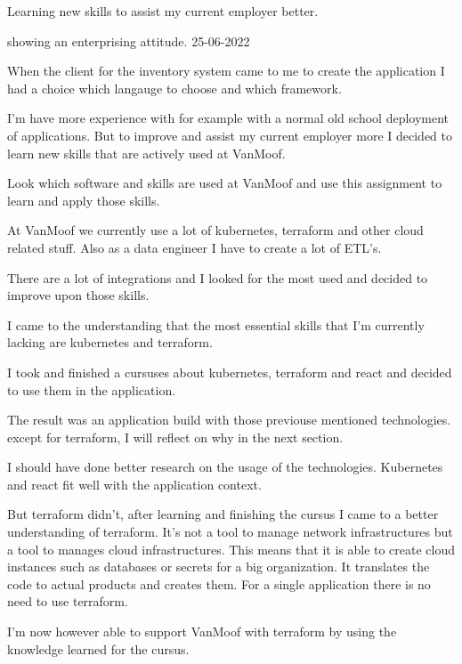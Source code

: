 {%
	\bewijs
	{%
		Learning new skills to assist my current employer better.
	}
	{%
		\starr
		{%
			showing an enterprising attitude.%
		}
		{%
			25-06-2022
		}
		{%

			When the client for the inventory system came to me to create the application I had a choice which langauge to choose and which framework.

			I'm have more experience with for example with a normal old school deployment of applications.
			But to improve and assist my current employer more I decided to learn new skills that are actively used at VanMoof.
		}
		{%
			Look which software and skills are used at VanMoof and use this assignment to learn and apply those skills.
		}
		{%
			At VanMoof we currently use a lot of kubernetes, terraform and other cloud related stuff.
			Also as a data engineer I have to create a lot of ETL's.

			There are a lot of integrations and I looked for the most used and decided to improve upon those skills.
		}
		{%
			I came to the understanding that the most essential skills that I'm currently lacking are kubernetes and terraform.

			I took and finished a cursuses about kubernetes, terraform and react and decided to use them in the application.

			The result was an application build with those previouse mentioned technologies.
			except for terraform, I will reflect on why in the next section.
		}
		{%
			I should have done better research on the usage of the technologies.
			Kubernetes and react fit well with the application context.

			But terraform didn't, after learning and finishing the cursus I came to a better understanding of terraform.
			It's not a tool to manage network infrastructures but a tool to manages cloud infrastructures.
			This means that it is able to create cloud instances such as databases or secrets for a big organization.
			It translates the code to actual products and creates them.
			For a single application there is no need to use terraform.

			I'm now however able to support VanMoof with terraform by using the knowledge learned for the cursus.
		}

}}
